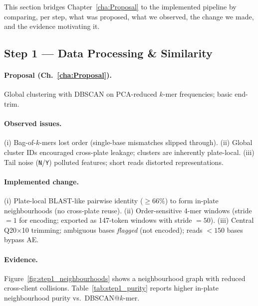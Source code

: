 This section bridges Chapter~\ref{cha:Proposal} to the implemented pipeline by comparing, per step, what was proposed, what we observed, the change we made, and the evidence motivating it.

\subsection*{Step 1 — Data Processing \& Similarity}
\paragraph{Proposal (Ch.~\ref{cha:Proposal}).}
Global clustering with DBSCAN on PCA-reduced $k$-mer frequencies; basic end-trim.

\paragraph{Observed issues.}
(i) Bag-of-$k$-mers lost order (single-base mismatches slipped through). 
(ii) Global cluster IDs encouraged cross-plate leakage; clusters are inherently plate-local.
(iii) Tail noise (\texttt{N}/\texttt{Y}) polluted features; short reads distorted representations.

\paragraph{Implemented change.}
(i) Plate-local BLAST-like pairwise identity ($\geq 66\%$) to form in-plate neighbourhoods (no cross-plate reuse). 
(ii) Order-sensitive 4-mer windows (stride $=1$ for encoding; exported as 147-token windows with stride $=50$). 
(iii) Central Q20$\times$10 trimming; ambiguous bases \emph{flagged} (not encoded); reads $<150$ bases bypass AE.

\paragraph{Evidence.}
Figure~\ref{fig:step1_neighbourhoods} shows a neighbourhood graph with reduced cross-client collisions. 
Table~\ref{tab:step1_purity} reports higher in-plate neighbourhood purity vs.\ DBSCAN@$k$-mer.


